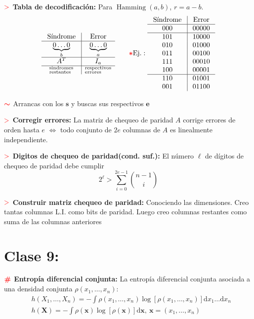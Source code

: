 \documentclass[%
 reprint,
 amsmath,amssymb,
 aps,
]{revtex4-1}
\begin{document}
\textbf{$\textcolor{red}{\mathbf{>}}$ Tabla de decodificación:} Para $\operatorname{Hamming}(a,b)$, $r=a-b$.
$$
\begin{array}{c|c}
\text { Síndrome } & \text { Error } \\
\hline \underbrace{0\ldots0}_b & \underbrace{0\ldots0}_a \\
\hline A^T & I_a \\
\hline ^\text{sindromes}_\text{restantes} & ^\text{respectivos}_\text{errores} \\
\end{array}
\qquad \textcolor{red}{\color{red}{\boldsymbol{*}}} \text{Ej.}: 
\begin{array}{c|c}
\text { Síndrome } & \text { Error } \\
\hline 000 & 00000 \\
\hline 101 & 10000 \\
010 & 01000 \\
011 & 00100 \\
111 & 00010 \\
100 & 00001 \\
\hline 110 & 01001 \\
001 & 01100
\end{array}
$$

\textbf{$\textcolor{red}{\color{red}{\boldsymbol{\sim}}}$ } Arrancas con los $\mathbf{s}$ y buscas sus respectivos $\mathbf{e}$

\textbf{$\textcolor{red}{\mathbf{>}}$ Corregir errores:} La matriz de chequeo de paridad $A$ corrige errores de orden hasta $e$ $\Leftrightarrow$ todo conjunto de $2e$ columnas de $A$ es linealmente independiente.

\textbf{$\textcolor{red}{\mathbf{>}}$ Digitos de chequeo de paridad(cond. suf.):} El número $\ell$ de dígitos de chequeo de paridad debe cumplir
$$
2^{\ell}>\sum_{i=0}^{2 e-1} {n-1 \choose i}
$$

\textbf{$\textcolor{red}{\mathbf{>}}$ Construir matriz chequeo de paridad:} 
Conociendo las dimensiones. Creo tantas columnas L.I. como bits de paridad. Luego creo columnas restantes como suma de las columnas anteriores 

\section{Clase 9:}

\textbf{$\color{red}{\textbf{\#}}$ Entropía diferencial conjunta:} 
La entropía diferencial conjunta asociada a una densidad conjunta $\rho\left(x_{1}, \ldots, x_{n}\right)$:
$$
\begin{aligned}
  &h\left(X_{1}, \ldots, X_{n}\right)=-\int \rho\left(x_{1}, \ldots, x_{n}\right) \log \left[\rho\left(x_{1}, \ldots, x_{n}\right)\right] \mathrm{d} x_{1} \ldots \mathrm{d} x_{n} \\
  &h(\boldsymbol{X})=-\int \rho(\boldsymbol{x}) \log [\rho(\boldsymbol{x})] \mathrm{d} \boldsymbol{x}
, \ \boldsymbol{x}=\left(x_{1}, \ldots, x_{n}\right)
\end{aligned}
$$
\end{document}

